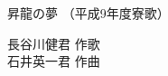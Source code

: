 \documentclass[10pt,b5j]{tarticle} %
\begin{document}
\begin{minipage}[c]{0.7\hsize} %
    \begin{center}
        {\LARGE
            昇龍の夢 %
        }
        {\small 
            （平成9年度寮歌） %
        }
    \end{center}
\end{minipage}
\begin{minipage}[c]{0.3\hsize} %
    \begin{flushright} %
        長谷川健君 作歌\\石井英一君 作曲 %
    \end{flushright}
\end{minipage}
\end{document}
